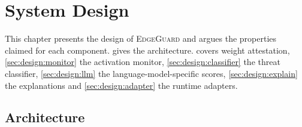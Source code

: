 \chapter{System Design}
\label{ch:design}

This chapter presents the design of \textsc{EdgeGuard} and argues the properties claimed for
each component.  gives the architecture. 
covers weight attestation, \cref{sec:design:monitor} the activation monitor,
\cref{sec:design:classifier} the threat classifier, \cref{sec:design:llm} the
language-model-specific scores, \cref{sec:design:explain} the explanations and
\cref{sec:design:adapter} the runtime adapters.

\section{Architecture}
\label{sec:design:overview}

